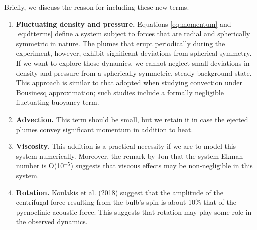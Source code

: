 Briefly, we discuss the reason for including these new terms.
\begin{enumerate}
\item {\bf Fluctuating density and pressure.}   Equations \ref{eq:momentum} and \ref{eq:dtterms} define a system subject to forces that are radial and spherically symmetric in nature.  The plumes that erupt periodically during the experiment, however, exhibit significant deviations from spherical symmetry.  If we want to explore those dynamics, we cannot neglect small deviations in density and pressure from a spherically-symmetric, steady background state.  This approach is similar to that adopted when studying convection under Bousinesq approximation; such studies include a formally negligible fluctuating buoyancy term.  
\item {\bf Advection. }  This term should be small, but we retain it in case the ejected plumes convey significant momentum in addition to heat. 
\item {\bf Viscosity. }  This addition is a practical necessity if we are to model this system numerically.  Moreover, the remark by Jon that the system Ekman number is O(10$^{-5}$) suggests that viscous effects may be non-negligible in this system.
\item {\bf Rotation. }  Koulakis et al. (2018) suggest that the amplitude of the centrifugal force resulting from the bulb's spin is about 10\% that of the pycnoclinic acoustic force.   This suggests that rotation may play some role in the observed dynamics.
\end{enumerate}



